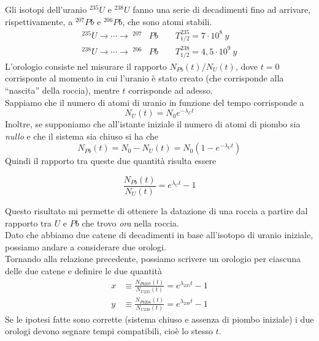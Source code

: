 Gli isotopi dell'uranio $^{235}U$ e $^{238}U$ fanno una serie di decadimenti fino ad arrivare, rispettivamente, a $^{207}Pb$ e $^{206}Pb$, che sono atomi stabili. 
%
\begin{align}
    ^{235}U \longrightarrow  \cdots \longrightarrow \ ^{207}&Pb \qquad T_{1/2}^{235} = 7 \cdot 10^{8} \ y\\
    ^{238}U \longrightarrow  \cdots \longrightarrow \ ^{206}&Pb \qquad T_{1/2}^{238} = 4,5 \cdot 10^{9} \ y
\end{align}
L'orologio consiste nel misurare il rapporto $N_{Pb}(t)/N_{U}(t)$, dove $t = 0$ corrisponte al momento in cui l'uranio è stato creato (che corrisponde alla ``nascita'' della roccia), mentre $t$ corrisponde ad adesso.\\
Sappiamo che il numero di atomi di uranio in funzione del tempo corrisponde a 
%
\begin{equation*}
    N_{U}(t) = N_0 e^{-\lambda_U t}
\end{equation*}
Inoltre, se supponiamo che all'istante iniziale il numero di atomi di piombo sia \emph{nullo} e che il sistema sia chiuso si ha che 
%
\begin{equation}
    N_{Pb}(t) = N_0 - N_{U}(t) = N_0 (1 - e^{- \lambda_U t})
    \label{eq:numero_Pb}
\end{equation}
Quindi il rapporto tra queste due quantità risulta essere 
% 
\begin{tcolorbox}[colback=black!5!white, colframe=black!45!white, boxrule=0.8pt]
\begin{equation}
    \frac{N_{Pb}(t)}{N_{U}(t)}  = e^{\lambda_U t} - 1
\end{equation}
\end{tcolorbox}
Questo risultato mi permette di ottenere la datazione di una roccia a partire dal rapporto tra $U$ e $Pb$ che trovo \emph{ora} nella roccia.\\

Dato che abbiamo due catene di decadimenti in base all'isotopo di uranio iniziale, possiamo andare a considerare due orologi. \\
Tornando alla relazione precedente, possiamo scrivere un orologio per ciascuna delle due catene e definire le due quantità
%
\begin{align}
    x & \equiv \frac{N_{Pb207}(t)}{N_{U235}(t)} = e^{\lambda_{235} t} - 1 \\
    y & \equiv \frac{N_{Pb206}(t)}{N_{U238}(t)} = e^{\lambda_{238} t} - 1
\end{align}
Se le ipotesi fatte sono corrette (sistema chiuso e assenza di piombo iniziale) i due orologi devono segnare tempi compatibili, cioè lo stesso $t$. 

